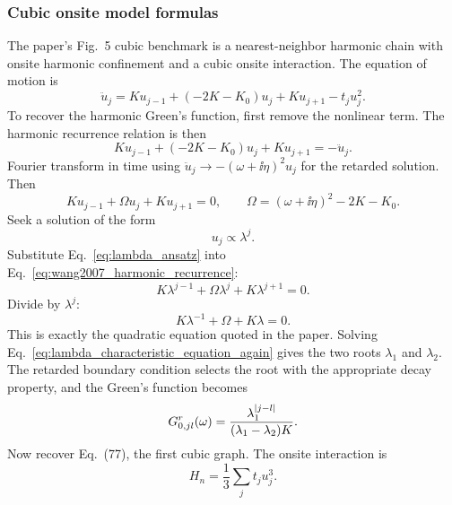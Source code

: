 \subsubsection{Cubic onsite model formulas}
The paper's Fig.~5 cubic benchmark is a nearest-neighbor harmonic chain with onsite harmonic confinement and a cubic onsite interaction. The equation of motion is
\begin{equation}
    \ddot u_j = K u_{j-1} + (-2K-K_0)u_j + K u_{j+1} - t_j u_j^2.
    \label{eq:wang2007_onsite_eom_again}
\end{equation}
To recover the harmonic Green's function, first remove the nonlinear term. The harmonic recurrence relation is then
\begin{equation}
    K u_{j-1} + (-2K-K_0)u_j + K u_{j+1} = -\ddot u_j.
\end{equation}
Fourier transform in time using $\ddot u_j \to -(\omega+\ii\eta)^2u_j$ for the retarded solution. Then
\begin{equation}
    K u_{j-1} + \Omega u_j + K u_{j+1} = 0,
    \qquad
    \Omega = (\omega+\ii\eta)^2 - 2K - K_0.
    \label{eq:wang2007_harmonic_recurrence}
\end{equation}
Seek a solution of the form
\begin{equation}
    u_j \propto \lambda^j.
    \label{eq:lambda_ansatz}
\end{equation}
Substitute Eq.~\eqref{eq:lambda_ansatz} into Eq.~\eqref{eq:wang2007_harmonic_recurrence}:
\begin{equation}
    K\lambda^{j-1} + \Omega \lambda^j + K\lambda^{j+1} = 0.
\end{equation}
Divide by $\lambda^j$:
\begin{equation}
    K\lambda^{-1} + \Omega + K\lambda = 0.
    \label{eq:lambda_characteristic_equation_again}
\end{equation}
This is exactly the quadratic equation quoted in the paper. Solving Eq.~\eqref{eq:lambda_characteristic_equation_again} gives the two roots $\lambda_1$ and $\lambda_2$. The retarded boundary condition selects the root with the appropriate decay property, and the Green's function becomes
\begin{equation}
    G_{0,jl}^r(\omega) = \frac{\lambda_1^{\left| j-l \right|}}{(\lambda_1-\lambda_2)K}.
    \label{eq:wang2007_harmonic_green_recovered}
\end{equation}
Now recover Eq.~(77), the first cubic graph. The onsite interaction is
\begin{equation}
    H_n = \frac{1}{3}\sum_j t_j u_j^3.
    \label{eq:onsite_cubic_hamiltonian_for_eq77}
\end{equation}
